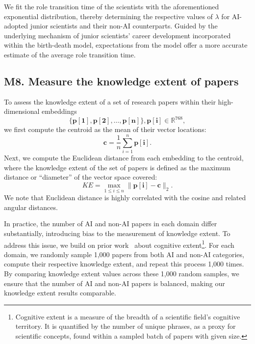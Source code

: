We fit the role transition time of the scientists with the aforementioned exponential distribution, thereby determining the respective values of $\lambda$ for AI-adopted junior scientists and their non-AI counterparts.
Guided by the underlying mechanism of junior scientists’ career development incorporated within the birth-death model, expectations from the model offer a more accurate estimate of the average role transition time.

\subsection*{M8. Measure the knowledge extent of papers}
To assess the knowledge extent of a set of research papers within their high-dimensional embeddings
\begin{equation}
\{\mathbf{p[1]},\mathbf{p[2]},\dots,\mathbf{p[n]}\}, \mathbf{p[i]}\in\mathbb{R}^{768},
\end{equation}
we first compute the centroid as the mean of their vector locations:
\begin{equation}
    \mathbf{c} = \frac{1}{n} \sum_{i=1}^{n} \mathbf{p[i]}.
\end{equation}
Next, we compute the Euclidean distance from each embedding to the centroid, where the knowledge extent of the set of papers is defined as the maximum distance or “diameter” of the vector space covered:
\begin{equation}
    KE = \max_{1\leq i\leq n}\|\mathbf{p[i]}-\mathbf{c}\|_2.
\end{equation}
We note that Euclidean distance is highly correlated with the cosine and related angular distances.

In practice, the number of AI and non-AI papers in each domain differ substantially, introducing bias to the measurement of knowledge extent.
To address this issue, we build on prior work~\supercite{milojevic2015quantifying} about cognitive extent\footnote{Cognitive extent is a measure of the breadth of a scientific field’s cognitive territory. It is quantified by the number of unique phrases, as a proxy for scientific concepts, found within a sampled batch of papers with given size.}.
For each domain, we randomly sample 1,000 papers from both AI and non-AI categories, compute their respective knowledge extent, and repeat this process 1,000 times.
By comparing knowledge extent values across these 1,000 random samples, we ensure that the number of AI and non-AI papers is balanced, making our knowledge extent results comparable.


